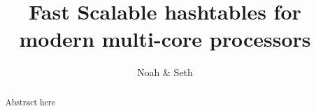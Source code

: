 \documentclass[12pt,letterpaper]{article}
\newcommand{\twocolstart}{\relax}
\newcommand{\twocolfinish}{\relax}
\newcommand{\twocolstart}{\begin{multicols}{2}}
\newcommand{\twocolfinish}{\end{multicols}}
\begin{document}
\title{Fast Scalable hashtables for modern multi-core processors}

\author{Noah \& Seth}


\maketitle
\begin{abstract}
  Abstract here
  
\par\vspace{\baselineskip}
\end{abstract}


\twocolstart








\twocolfinish


\end{document}
